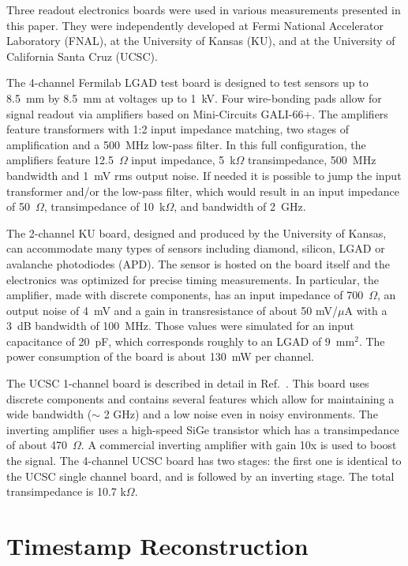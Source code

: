 \documentclass[preprint,1p]{elsarticle}
\begin{document}
Three readout electronics boards were used in various measurements presented in this paper.
They were independently developed at Fermi National Accelerator Laboratory (FNAL),
at the University of Kansas (KU), and at the University of California Santa Cruz (UCSC).

The 4-channel Fermilab LGAD test board is designed to test sensors up to 8.5~mm
by 8.5~mm at voltages up to 1~kV. Four wire-bonding pads allow for signal
readout via amplifiers based on Mini-Circuits GALI-66+. The amplifiers feature 
transformers with 1:2 input impedance matching, two stages of amplification and 
a 500~MHz low-pass filter. In this full configuration, the amplifiers feature
12.5~$\Omega$ input impedance, 5~k$\Omega$ transimpedance, 500~MHz bandwidth and
1~mV rms output noise. If needed it is possible to jump the input transformer 
and/or the low-pass filter, which would result in an input impedance of 50~$\Omega$,
transimpedance of 10~k$\Omega$, and bandwidth of 2~GHz.

The 2-channel KU board, designed and produced by the University of Kansas, can
accommodate many types of sensors including diamond, silicon, LGAD or avalanche photodiodes (APD). 
The sensor is hosted on the board itself and the electronics was optimized for precise 
timing measurements. In particular, the amplifier, made with discrete components, 
has an input impedance of 700~$\Omega$, an output noise of 4~mV and a gain in 
transresistance of about 50 mV/$\mu$A with a 3~dB bandwidth of 100~MHz. 
Those values were simulated for an input capacitance of 20~pF, 
which corresponds roughly to an LGAD of $9$~$\mathrm{mm}^{2}$. The power
consumption of the board is about 130~mW per channel. 

The UCSC 1-channel board is described in detail in
Ref.~\cite{Cartiglia201783}. This board uses discrete components and contains
several features which allow for maintaining a wide bandwidth ($\sim$ 2 GHz) and a
low noise even in noisy environments. The inverting amplifier uses a high-speed
SiGe transistor which has a transimpedance of about 470~$\Omega$. A commercial
inverting amplifier with gain 10x is used to boost the signal. The 4-channel
UCSC board has two stages: the first one is identical to the UCSC single channel
board, and is followed by an inverting stage. The total transimpedance is 10.7
k$\Omega$.


\section{Timestamp Reconstruction}
\label{sec:timestampReco}
\end{document}
